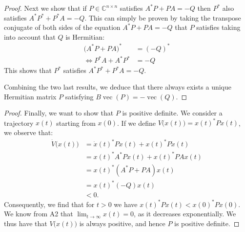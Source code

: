 \documentclass[11pt]{article}
\DeclareMathOperator{\vect}{vec}
\newcommand{\complex}{\mathbb{C}} %
\begin{document}
\begin{proof}
Next we show that if $P\in\complex^{n\times n}$ satisfies $A^*P+PA=-Q$ then $P^*$ also satisfies $A^*P^*+P^*A=-Q$.
This can simply be proven by taking the transpose conjugate of both sides of the equation $A^*P+PA=-Q$ that \(P\) satisfies taking into account that \(Q\) is Hermitian:
\begin{align*}
    \big(A^*P+PA\big)^*&=(-Q)^*\\
    \iff P^*A+A^*P^*&=-Q
\end{align*}
This shows that $P^*$ satisfies $A^*P^*+P^*A=-Q$.

Combining the two last results, we deduce that there always exists a unique Hermitian matrix $P$ satisfying $B\vect(P)=-\vect(Q)$.
\end{proof}

\begin{proof}
Finally, we want to show that $P$ is positive definite. We consider a trajectory $x(t)$ starting from $x(0)$. If we define $V\big(x(t)\big)=x(t)^*Px(t)$, we observe that:
\begin{align*}
    \dot{V}\big(x(t)\big)&=\dot{x}(t)^*P x(t)+x(t)^*P\dot{x}(t)\\
    &=x(t)^*A^*P x(t)+x(t)^*P A x(t)\\
    &=x(t)^*(A^*P+P A) x(t)\\
    &=x(t)^*(-Q) x(t)\\
    &< 0.
\end{align*}
Consequently, we find that for $t>0$ we have $x(t)^*P x(t) < x(0)^*P x(0)$.
We know from A2 that \(\lim_{t \to \infty} x(t) = 0\), as it decreases exponentially.
We thus have that \(V\big(x(t)\big)\) is always positive, and hence \(P\) is positive definite.
\end{proof}
\end{document}
